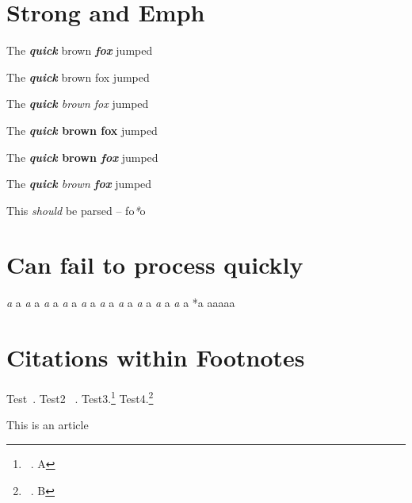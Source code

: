
\def\mytitle{Edge Cases}


\part{Strong and Emph}
\label{strongandemph}

The \textbf{\emph{quick}} brown \textbf{\emph{fox}} jumped

The \textbf{\emph{quick}} brown fox jumped

The \emph{\textbf{quick} brown fox} jumped

The \textbf{\emph{quick} brown fox} jumped

The \textbf{\emph{quick} brown \emph{fox}} jumped

The \emph{\textbf{quick} brown \textbf{fox}} jumped

This \emph{should} be parsed -- fo\emph{*}o

\part{Can fail to process quickly}
\label{canfailtoprocessquickly}

\emph{a
}a
\emph{a
}a
\emph{a
}a
\emph{a
}a
\emph{a
}a
\emph{a
}a
\emph{a
}a
\emph{a
}a
\emph{a
}a
\emph{a
}a
*a
aaaaa

\part{Citations within Footnotes}
\label{citationswithinfootnotes}

Test~\citep{Citekey;}. Test2 ~\citep{Citekey;}. Test3.\footnote{~\citep{Citekey;}. A} Test4.\footnote{~\citep{Citekey;}. B}

\begin{thebibliography}{0}

This is an article




\end{thebibliography}





